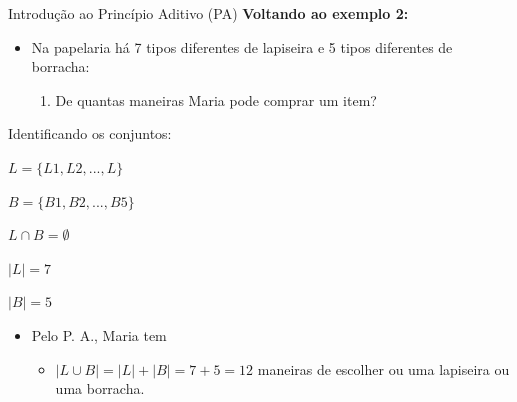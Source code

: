 \documentclass[aspectratio=169]{beamer}
\begin{document}
\begin{frame}{Introdução ao Princípio Aditivo (PA)}
    \textbf{Voltando ao exemplo 2:}

    \vspace{4mm}
    \begin{itemize}
        \item Na papelaria há 7 tipos diferentes de lapiseira e 5 tipos diferentes de borracha:
        \begin{enumerate}[a]
            \item De quantas maneiras Maria pode comprar um item?
        \end{enumerate}
    \end{itemize}

    \vspace{3mm}
    Identificando os conjuntos:
    \begin{center}
        \begin{multicols}{2}
            $L = \{L1, L2, ..., L\}$
            
            \columnbreak
    
            $B = \{B1, B2, ..., B5\}$    
        \end{multicols}
    \end{center}


    \begin{center}
        \begin{multicols}{3}
            $L \cap B = \emptyset$ 

            \columnbreak

            $|L| = 7$

            \columnbreak

            $|B| = 5$
        \end{multicols}
    \end{center}

    \begin{itemize}
        \item Pelo P. A., Maria tem
        \begin{itemize}
            \item[] $|L \cup B| = |L| + |B| = 7 + 5 = 12$ maneiras de escolher ou uma lapiseira ou uma borracha. 
        \end{itemize}
    \end{itemize}
\end{frame}
\end{document}
